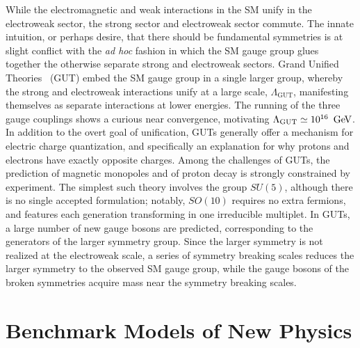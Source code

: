 While the electromagnetic and weak interactions in the SM unify in the electroweak sector,
the strong sector and electroweak sector commute. The innate intuition,
or perhaps desire, that there should be fundamental symmetries is at slight conflict with the {\em ad hoc} fashion in which the SM gauge group glues together the otherwise separate strong and electroweak sectors. Grand Unified Theories~\cite{gut_1, gut_2, gut_3, gut_4} (GUT) embed the SM gauge group in a single larger group, whereby the strong and electroweak interactions unify at a large scale, $\Lambda_{\text{GUT}}$, manifesting themselves as separate interactions at lower energies. The running of the three gauge couplings shows a curious near convergence, motivating $\Lambda_{\text{GUT}}\simeq10^{16}\,\GeV$.
In addition to the overt goal of unification, GUTs generally offer a mechanism for electric charge quantization, and specifically an explanation for why protons and electrons have exactly opposite charges. Among the challenges of GUTs, the prediction of magnetic monopoles and of proton decay
is strongly constrained by experiment. The simplest such theory involves the group $SU(5)$, although there is no single accepted formulation; notably, $SO(10)$ requires no extra fermions, and features each generation transforming in one irreducible multiplet.
In GUTs, a large number of new gauge bosons are predicted, corresponding to the generators of the larger symmetry group. Since the larger symmetry is not realized at the electroweak scale, a series of symmetry breaking scales reduces the larger symmetry to the observed SM gauge group, while the gauge bosons of the broken symmetries acquire mass near the symmetry breaking scales. 


\section{Benchmark Models of New Physics}

